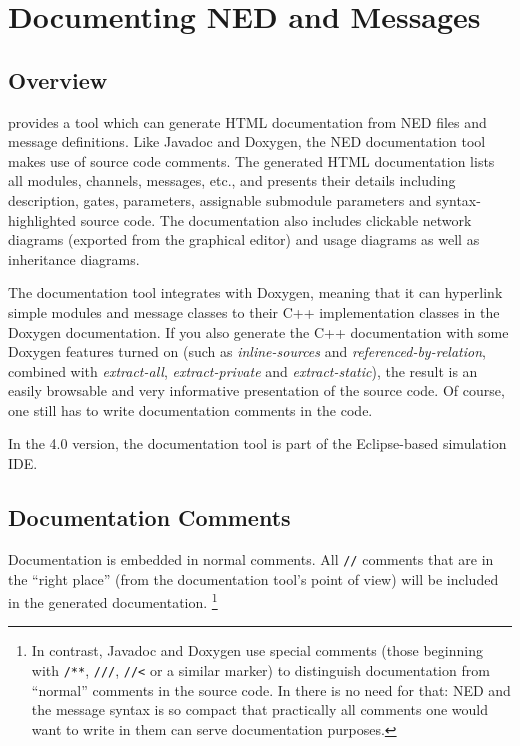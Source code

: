\chapter{Documenting NED and Messages}
\label{cha:neddoc}

\section{Overview}

{\opp} provides a tool which can generate HTML documentation from NED files
and message definitions. Like Javadoc and Doxygen, the NED documentation tool
makes use of source code comments. The generated HTML documentation
lists all modules, channels, messages, etc., and presents their details including
description, gates, parameters, assignable submodule parameters and
syntax-highlighted source code. The documentation also includes clickable
network diagrams (exported from the graphical editor) and usage diagrams as
well as inheritance diagrams.

The documentation tool integrates with Doxygen, meaning that it can
hyperlink simple modules and message classes to their C++ implementation
classes in the Doxygen documentation. If you also generate the C++
documentation with some Doxygen features turned on (such as
\textit{inline-sources} and \textit{referenced-by-relation}, combined with
\textit{extract-all}, \textit{extract-private} and
\textit{extract-static}), the result is an easily browsable and very
informative presentation of the source code. Of course, one still has to
write documentation comments in the code.

In the 4.0 version, the documentation tool is part of the Eclipse-based
simulation IDE.


\section{Documentation Comments}

Documentation is embedded in normal comments. All \texttt{//} comments
that are in the ``right place'' (from the documentation tool's
point of view) will be included in the generated documentation.
  \footnote{In contrast, Javadoc and Doxygen use special comments (those
     beginning with \texttt{/**}, \texttt{///}, \texttt{//<} or a similar
     marker) to distinguish documentation from ``normal'' comments in the
     source code. In {\opp} there is no need for that: NED and the message
     syntax is so compact that practically all comments one would want to write
     in them can serve documentation purposes.}

